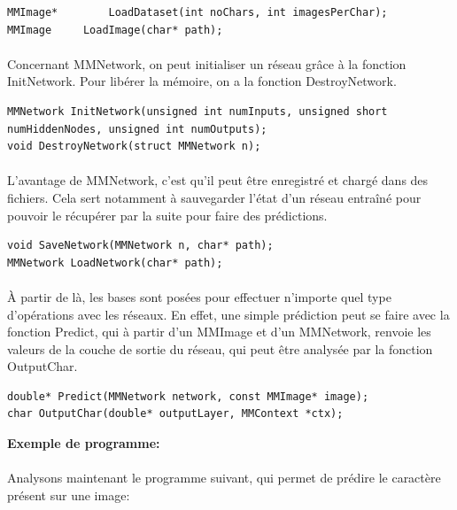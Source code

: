 \documentclass{article}
\begin{document}
\begin{lstlisting}
MMImage*		LoadDataset(int noChars, int imagesPerChar);
MMImage		LoadImage(char* path);
\end{lstlisting}

\paragraph{}Concernant MMNetwork, on peut initialiser un réseau grâce à la fonction InitNetwork.
Pour libérer la mémoire, on a la fonction DestroyNetwork.

\begin{lstlisting}
MMNetwork InitNetwork(unsigned int numInputs, unsigned short numHiddenNodes, unsigned int numOutputs);
void DestroyNetwork(struct MMNetwork n);

\end{lstlisting}

\paragraph{}L'avantage de MMNetwork, c'est qu'il peut être enregistré et chargé dans des fichiers. Cela sert notamment à sauvegarder l'état d'un réseau entraîné pour pouvoir le récupérer par la suite pour faire des prédictions.

\begin{lstlisting}
void SaveNetwork(MMNetwork n, char* path);
MMNetwork LoadNetwork(char* path);
\end{lstlisting}


\paragraph{}
À partir de là, les bases sont posées pour effectuer n'importe quel type d'opérations avec les réseaux. En effet, une simple prédiction peut se faire avec la fonction Predict, qui à partir d'un MMImage et d'un MMNetwork, renvoie les valeurs de la couche de sortie du réseau, qui peut être analysée par la fonction OutputChar.

\begin{lstlisting}
double*	Predict(MMNetwork network, const MMImage* image);
char OutputChar(double* outputLayer, MMContext *ctx);
\end{lstlisting}

\textbf{Exemple de programme:}

\paragraph{}Analysons maintenant le programme suivant, qui permet de prédire le caractère présent sur une image:
\end{document}
